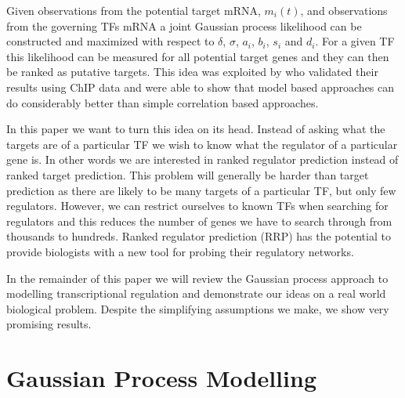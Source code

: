 \documentclass{article}
\begin{document}
Given  observations  from the  potential  target  mRNA, $m_i(t)$,  and
observations  from the  governing TFs  mRNA a  joint  Gaussian process
likelihood can be constructed  and maximized with respect to $\delta$,
$\sigma$,  $a_i$,  $b_i$,  $s_i$  and  $d_i$.  For  a  given  TF  this
likelihood can be measured for all potential target genes and they can
then  be ranked  as  putative  targets.  This  idea  was exploited  by
\cite{Honkela:modelbased10}  who validated  their  results using  ChIP
data  and  were  able to  show  that  model  based approaches  can  do
considerably better than simple correlation based approaches.

In this paper we want to turn this idea on its head. Instead of asking
what  the targets are  of a  particular TF  we wish  to know  what the
regulator of a particular gene is. In other words we are interested in
ranked regulator prediction instead  of ranked target prediction. This
problem will generally  be harder than target prediction  as there are
likely to be many targets of a particular TF, but only few regulators.
However, we  can restrict  ourselves to known  TFs when  searching for
regulators  and this reduces  the number  of genes  we have  to search
through from thousands to hundreds.  Ranked regulator prediction (RRP)
has the  potential to provide biologists  with a new  tool for probing
their regulatory networks.

In the  remainder of  this paper we  will review the  Gaussian process
approach to  modelling transcriptional regulation  and demonstrate our
ideas  on a  real world  biological problem.  Despite  the simplifying
assumptions we make, we show very promising results.

\section{Gaussian Process Modelling}
\end{document}
